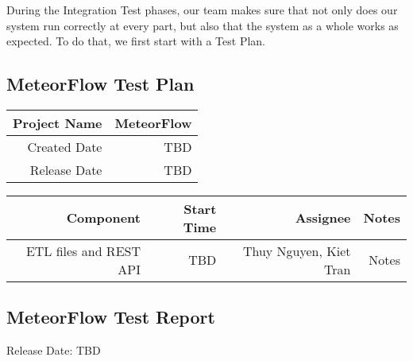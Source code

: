 During the Integration Test phases, our team makes sure that not only does our system run correctly at every part,
but also that the system as a whole works as expected. To do that, we first start with a Test Plan.

\subsection{MeteorFlow Test Plan}

\begin{center}
    \begin{tabular}[H]{|r|r|}
        \hline
        Project Name & MeteorFlow \\
        \hline
        Created Date & TBD        \\
        \hline
        Release Date & TBD        \\
        \hline
    \end{tabular}
\end{center}


\begin{tabular}[H]{|r|r|r|r|}
    \hline
    Component              & Start Time & Assignee               & Notes \\
    \hline
    ETL files and REST API & TBD        & Thuy Nguyen, Kiet Tran & Notes \\
    \hline
\end{tabular}


\subsection{MeteorFlow Test Report}

Release Date: TBD
